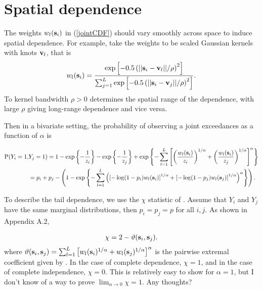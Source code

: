 \documentclass[11pt]{article}
\newcommand{\bs}{ \mbox{\bf s}}
\newcommand{\bv}{ \mbox{\bf v}}
\newcommand{\beq}{ \begin{equation}}
\newcommand{\eeq}{ \end{equation}}
\begin{document}
\section{Spatial dependence}\label{s:spatial}

The weights $w_{l}(\bs_i)$ in (\ref{jointCDF}) should vary smoothly across space to induce spatial dependence.  For example, \cite{reich-2012} take the weights to be scaled Gaussian kernels with knots $\bv_l$, that is
\beq\label{w}
   w_{l}(\bs_i) = \frac{\exp\left[-0.5\left(||\bs_i-\bv_l||/\rho\right)^2\right]}
                 {\sum_{j=1}^L\exp\left[-0.5\left(||\bs_i-\bv_j||/\rho\right)^2\right]}.
\eeq
To kernel bandwidth $\rho>0$ determines the spatial range of the dependence, with large $\rho$ giving long-range dependence and vice versa.  

Then in a bivariate setting, the probability of observing a joint exceedances as a function of $\alpha$ is

\begin{align} \label{biv}
  \text{P}(Y_i = 1, & Y_j = 1) = 1 - \exp\left\{ - \frac{ 1 }{ z_i } \right\} - \exp \left\{ - \frac{ 1 }{z_j} \right\} + \exp \left\{ - \sum_{ l = 1 }^{ L } \left[ \left( \frac{ w_{ l }(\bs_i) }{ z_i } \right)^{1/\alpha} + \left( \frac{ w_{l }(\bs_i)}{z_j} \right)^{1/\alpha} \right]^{\alpha} \right\} \nonumber \\
  		&= p_i + p_j - \left( 1 - \exp \left \{ - \sum_{ l = 1 }^{ L } \left( \left[ -\log(1-p_i) w_{l}(\bs_i) \right]^{ 1/\alpha } + \left[ -\log(1 - p_j) w_{ l}(\bs_j) \right]^{ 1/\alpha } \right)^{\alpha} \right \} \right).
\end{align}

To describe the tail dependence, we use the $\chi$ statistic of \citet{Coles-1999}.
Assume that $Y_i$ and $Y_j$ have the same marginal distributions, then $p_i = p_j = p$ for all $i, j$.
As shown in Appendix A.2, 

\begin{align}
\chi = 2 -  \vartheta(\bs_i, \bs_j).
\end{align}
where $\vartheta (\bs_i, \bs_j) = \sum_{ l = 1 }^{ L } \left[ w_{l}(\bs_i)^{ 1/\alpha } +  w_{ l}(\bs_j)^{ 1/\alpha } \right]^\alpha$ is the pairwise extremal coefficient given by \citet{reich-2012}.
In the case of complete dependence, $\chi = 1$, and in the case of complete independence, $\chi = 0$. 
This is relatively easy to show for $\alpha = 1$, but I don't know of a way to prove $\lim_{\alpha \rightarrow 0} \chi = 1$. Any thoughts?
\end{document}
